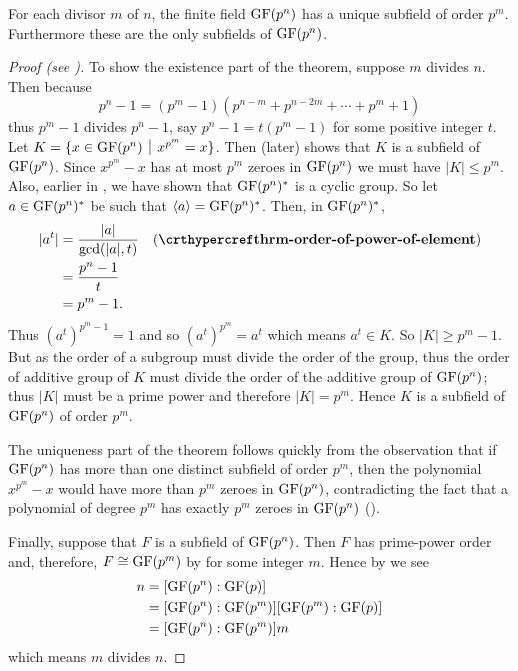 \begin{theorem}\label{thrm-subfields-of-finite-field}
    For each divisor $m$ of $n$, the finite field $\mathrm{GF}(p^n)$ has a unique subfield of order $p^m$. Furthermore these are the only subfields of $\mathrm{GF}(p^n)$.
\end{theorem}
\begin{proof}[Proof (see {\cite[Theorem 22.3]{gallian_2016}})]
    To show the existence part of the theorem, suppose $m$ divides $n$. Then because
    \[
        p^n - 1 = (p^m-1)(p^{n-m} + p^{n-2m} + \cdots + p^m + 1)
    \]
    thus $p^m - 1$ divides $p^n - 1$, say $p^n - 1 = t(p^m - 1)$ for some positive integer $t$. Let $K = \{x \in \GF{p^n} \vert x^{p^m} = x\}$. Then  (later) shows that $K$ is a subfield of $\mathrm{GF}(p^n)$. Since $x^{p^m} - x$ has at most $p^m$ zeroes in $\mathrm{GF}(p^n)$ we must have $|K| \leq p^m$. Also, earlier in , we have shown that $\mathrm{GF}(p^n)^\ast$ is a cyclic group. So let $a \in \mathrm{GF}(p^n)^\ast$ be such that $\left\langle a\right\rangle = \mathrm{GF}(p^n)^\ast$. Then, in $\mathrm{GF}(p^n)^\ast$,
    \begin{align*}
        |a^t| &= \frac{|a|}{\gcd(|a|, t)} & (\myref{thrm-order-of-power-of-element})\\
        &= \frac{p^n - 1}{t}\\
        &= p^m - 1.
    \end{align*}
    Thus $(a^t)^{p^m-1} = 1$ and so $(a^t)^{p^m} = a^t$ which means $a^t \in K$. So $|K| \geq p^m - 1$. But as the order of a subgroup must divide the order of the group, thus the order of additive group of $K$ must divide the order of the additive group of $\mathrm{GF}(p^n)$; thus $|K|$ must be a prime power and therefore $|K| = p^m$. Hence $K$ is a subfield of $\mathrm{GF}(p^n)$ of order $p^m$.

    The uniqueness part of the theorem follows quickly from the observation that if $\mathrm{GF}(p^n)$ has more than one distinct subfield of order $p^m$, then the polynomial $x^{p^m} - x$ would have more than $p^m$ zeroes in $\mathrm{GF}(p^n)$, contradicting the fact that a polynomial of degree $p^m$ has exactly $p^m$ zeroes in $\mathrm{GF}(p^n)$ ().

    Finally, suppose that $F$ is a subfield of $\mathrm{GF}(p^n)$. Then $F$ has prime-power order and, therefore, $F \cong \mathrm{GF}(p^m)$ by  for some integer $m$. Hence by  we see
    \begin{align*}
        n &= [\mathrm{GF}(p^n):\mathrm{GF}(p)]\\
        &= [\mathrm{GF}(p^n):\mathrm{GF}(p^m)][\mathrm{GF}(p^m):\mathrm{GF}(p)]\\
        &= [\mathrm{GF}(p^n):\mathrm{GF}(p^m)]m
    \end{align*}
    which means $m$ divides $n$.
\end{proof}

